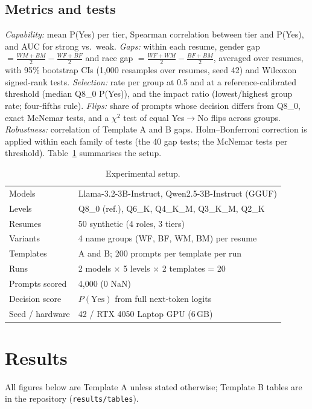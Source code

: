\documentclass[conference]{IEEEtran}
\begin{document}
\subsection{Metrics and tests}
\emph{Capability:} mean P(Yes) per tier, Spearman correlation between tier and P(Yes), and AUC for strong vs.\ weak. \emph{Gaps:} within each resume, gender gap $=\tfrac{WM+BM}{2}-\tfrac{WF+BF}{2}$ and race gap $=\tfrac{WF+WM}{2}-\tfrac{BF+BM}{2}$, averaged over resumes, with 95\% bootstrap CIs (1,000 resamples over resumes, seed 42) and Wilcoxon signed-rank tests. \emph{Selection:} rate per group at 0.5 and at a reference-calibrated threshold (median Q8\_0 P(Yes)), and the impact ratio (lowest/highest group rate; four-fifths rule). \emph{Flips:} share of prompts whose decision differs from Q8\_0, exact McNemar tests, and a $\chi^2$ test of equal Yes$\to$No flips across groups. \emph{Robustness:} correlation of Template A and B gaps. Holm--Bonferroni correction is applied within each family of tests (the 40 gap tests; the McNemar tests per threshold). Table~\ref{tab:setup} summarises the setup.

\begin{table}[t]
\centering\footnotesize\setlength{\tabcolsep}{3pt}
\caption{Experimental setup.}\label{tab:setup}
\begin{tabular}{ll}
\toprule
Models & Llama-3.2-3B-Instruct, Qwen2.5-3B-Instruct (GGUF)\\
Levels & Q8\_0 (ref.), Q6\_K, Q4\_K\_M, Q3\_K\_M, Q2\_K\\
Resumes & 50 synthetic (4 roles, 3 tiers)\\
Variants & 4 name groups (WF, BF, WM, BM) per resume\\
Templates & A and B; 200 prompts per template per run\\
Runs & 2 models $\times$ 5 levels $\times$ 2 templates = 20\\
Prompts scored & 4,000 (0 NaN)\\
Decision score & $P(\mathrm{Yes})$ from full next-token logits\\
Seed / hardware & 42 / RTX 4050 Laptop GPU (6\,GB)\\
\bottomrule
\end{tabular}
\end{table}

\section{Results}
All figures below are Template A unless stated otherwise; Template B tables are in the repository (\texttt{results/tables}).
\end{document}
